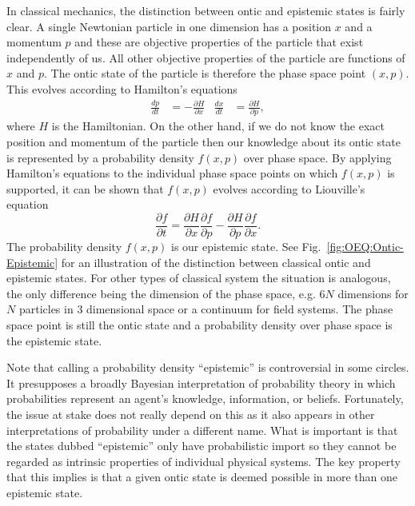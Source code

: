 \documentclass[DIV=calc,fontsize=12pt]{scrartcl} %
\theoremstyle{definition}
\theoremstyle{plain}
\begin{document}
In classical mechanics, the distinction between ontic and epistemic
states is fairly clear.  A single Newtonian particle in one dimension
has a position $x$ and a momentum $p$ and these are objective
properties of the particle that exist independently of us.  All other
objective properties of the particle are functions of $x$ and $p$.
The ontic state of the particle is therefore the phase space point
$(x,p)$.  This evolves according to Hamilton's equations
\begin{align}
\frac{d p}{d t} & = -\frac{\partial H}{\partial x} & \frac{d x}{d t}
& = \frac{\partial H}{\partial p},
\end{align}
where $H$ is the Hamiltonian.  On the other hand, if we do not know
the exact position and momentum of the particle then our knowledge
about its ontic state is represented by a probability density $f(x,p)$
over phase space.  By applying Hamilton's equations to the individual
phase space points on which $f(x,p)$ is supported, it can be shown
that $f(x,p)$ evolves according to Liouville's equation
\begin{equation}
\frac{\partial f}{\partial t} = \frac{\partial H}{\partial
x}\frac{\partial f}{\partial p} - \frac{\partial H}{\partial
p}\frac{\partial f}{\partial x}.
\end{equation}
The probability density $f(x,p)$ is our epistemic state.  See
Fig.~\ref{fig:OEQ:Ontic-Epistemic} for an illustration of the
distinction between classical ontic and epistemic states.  For other
types of classical system the situation is analogous, the only
difference being the dimension of the phase space, e.g. $6N$
dimensions for $N$ particles in $3$ dimensional space or a continuum
for field systems.  The phase space point is still the ontic state and
a probability density over phase space is the epistemic state.

Note that calling a probability density ``epistemic'' is controversial
in some circles.  It presupposes a broadly Bayesian interpretation of
probability theory in which probabilities represent an agent's
knowledge, information, or beliefs.  Fortunately, the issue at stake
does not really depend on this as it also appears in other
interpretations of probability under a different name.  What is
important is that the states dubbed ``epistemic'' only have
probabilistic import so they cannot be regarded as intrinsic
properties of individual physical systems.  The key property that this
implies is that a given ontic state is deemed possible in more than
one epistemic state.
\end{document}
